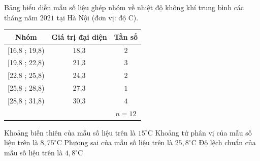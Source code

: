 \begin{ex}%
	Bảng biểu diễn mẫu số liệu ghép nhóm về nhiệt độ không khí trung bình các tháng năm $2021$ tại Hà Nội (đơn vị: độ C).
	\begin{center}
		\begin{tabular}{|c|c|c|}
			\hline Nhóm & Giá trị đại diện & Tần số \\
			\hline [16,8 ; 19,8) & 18,3 & $2$ \\
			\hline [19,8 ; 22,8) & 21,3 & $3$ \\
			\hline [22,8 ; 25,8) & 24,3 & $2$ \\
			\hline [25,8 ; 28,8) & 27,3 & $1$ \\
			\hline [28,8 ; 31,8) & 30,3 & $4$ \\
			\hline & & $n=12$ \\
			\hline
		\end{tabular}
	\end{center}
	\choiceTF
	{\True Khoảng biến thiên của mẫu số liệu trên là $15^{\circ} \mathrm{C}$}
	{\True Khoảng tứ phân vị của mẫu số liệu trên là $8{,}75^{\circ} \mathrm{C}$}
	{Phương sai của mẫu số liệu trên là $25{,}8^{\circ} \mathrm{C}$}
	{Độ lệch chuẩn của mẫu số liệu trên là $4{,}8^{\circ} \mathrm{C}$}
\end{ex}
